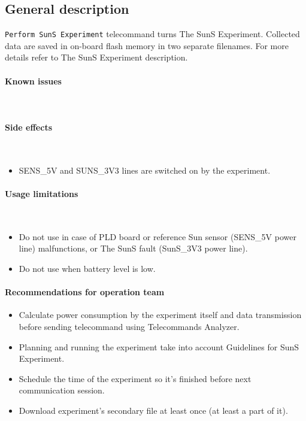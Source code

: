 

\subsection{General description}
\texttt{Perform SunS Experiment} telecommand turns The SunS Experiment. Collected data are saved in on-board flash memory in two separate filenames. For more details refer to The SunS Experiment description.

\paragraph{Known issues} \mbox{} \\
\None

\paragraph{Side effects} \mbox{} \\
\begin{itemize}
    \item SENS_5V and SUNS_3V3 lines are switched on by the experiment.
\end{itemize}


\paragraph{Usage limitations} \mbox{} \\
\begin{itemize}
    \item Do not use in case of PLD board or reference Sun sensor (SENS_5V power line) malfunctions, or The SunS fault (SunS_3V3 power line).
    \item Do not use when battery level is low.
\end{itemize}

\paragraph{Recommendations for operation team}
\begin{itemize}
    \item Calculate power consumption by the experiment itself and data transmission before sending telecommand using Telecommands Analyzer.
    \item Planning and running the experiment take into account Guidelines for SunS Experiment.
    \item Schedule the time of the experiment so it's finished before next communication session.
    \item Download experiment's secondary file at least once (at least a part of it).
\end{itemize}

